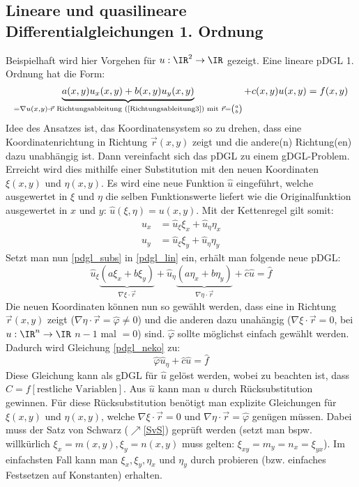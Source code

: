 \subsection{Lineare und quasilineare Differentialgleichungen 1. Ordnung}
Beispielhaft wird hier Vorgehen für $u:\IR^2\rightarrow\IR$ gezeigt. Eine lineare pDGL 1. Ordnung hat die Form:
\begin{equation}\label{pdgl_lin}
	\underbrace{a(x,y)u_x(x,y)+b(x,y)u_y(x,y)}_{=\nabla u(x,y)\cdot \vec{r} \text{ Richtungsableitung (\ref{Richtungsableitung3}) mit }\vec{r}=\binom{a}{b}}+c(x,y)u(x,y)=f(x,y)
\end{equation}
Idee des Ansatzes ist, das Koordinatensystem so zu drehen, dass eine Koordinatenrichtung in Richtung $\vec{r} (x,y)$ zeigt und die andere(n) Richtung(en) dazu unabhängig ist. Dann vereinfacht sich das pDGL zu einem gDGL-Problem. Erreicht wird dies mithilfe einer Substitution mit den  neuen Koordinaten $\xi(x,y)$ und $\eta(x,y)$. Es wird eine neue Funktion $\hat{u}$ eingeführt, welche ausgewertet in $\xi$ und $\eta$ die selben Funktionswerte liefert wie die Originalfunktion ausgewertet in $x$ und $y$: $\hat{u}(\xi,\eta)=u(x,y)$. Mit der Kettenregel gilt somit:
\begin{equation}\label{pdgl_subs}
	\begin{split}
		u_x&=\hat{u}_\xi\xi_x+\hat{u}_\eta\eta_x\\
		u_y&=\hat{u}_\xi\xi_y+\hat{u}_\eta\eta_y
	\end{split}
\end{equation}
Setzt man nun \ref{pdgl_subs} in \ref{pdgl_lin} ein, erhält man folgende neue pDGL:
\begin{equation}\label{pdgl_neko}
	\hat{u}_\xi\underbrace{\left(a\xi_x+b\xi_y\right)}_{\nabla \xi \cdot \vec{r}}+\hat{u}_\eta\underbrace{\left(a\eta_x+b\eta_y\right)}_{\nabla \eta \cdot \vec{r}}+\hat{c}\hat{u}=\hat{f}
\end{equation}
Die neuen Koordinaten können nun so gewählt werden, dass eine in Richtung $\vec{r}(x,y)$ zeigt ($\nabla \eta \cdot \vec{r}=\hat{\varphi}\neq 0$) und die anderen dazu unahängig ($\nabla \xi \cdot \vec{r}=0$, bei $u:\IR^n\to\IR$ $n-1$ mal $=0$) sind. $\hat{\varphi}$ sollte möglichst einfach gewählt werden. Dadurch wird Gleichung \ref{pdgl_neko} zu:
\begin{equation}
	\hat{\varphi}\hat{u}_\eta+\hat{c}\hat{u}=\hat{f}
\end{equation}
Diese Gleichung kann als gDGL für $\hat{u}$ gelöst werden, wobei zu beachten ist, dass $C=f[\text{restliche Variablen}]$. Aus $\hat{u}$ kann man $u$ durch Rücksubstitution gewinnen. Für diese Rücksubstitution benötigt man explizite Gleichungen für $\xi(x,y)$ und $\eta(x,y)$, welche $\nabla \xi \cdot \vec{r}=0$ und $\nabla \eta \cdot \vec{r}=\hat{\varphi}$ genügen müssen. Dabei muss der Satz von Schwarz ($\nearrow$\ref{SvS}) geprüft werden (setzt man bspw. willkürlich $\xi_x=m(x,y),\xi_y=n(x,y)$ muss gelten: $\xi_{xy}=m_y=n_x=\xi_{yx}$). Im einfachsten Fall kann man $\xi_x,\xi_y,\eta_x$ und $\eta_y$ durch probieren (bzw. einfaches Festsetzen auf Konstanten) erhalten.
